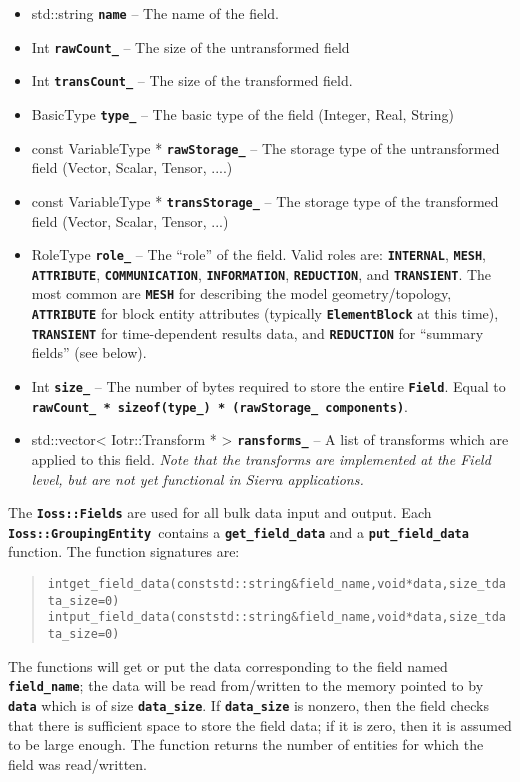 \documentclass[11pt,twoside]{article}
\newcommand{\code}[1]
   {\mbox{\bf\tt #1}\null}
\newenvironment{source}
{\small\begin{quote}\begin{alltt}}
{\end{alltt}\end{quote}\normalsize}
\begin{document}
\begin{itemize}
\item {
std::string \code{name} -- The name of the field.}
\item {
Int \code{rawCount\_} -- The size of the untransformed
field }
\item {
Int \code{transCount\_} -- The size of the transformed
field.}
\item {
BasicType \code{type\_} -- The basic type of the field
(Integer, Real, String)}
\item {
const VariableType * \code{rawStorage\_} -- The storage
type of the untransformed field (Vector, Scalar, Tensor, ....)}
\item {
const VariableType * \code{transStorage\_} -- The storage
type of the transformed field (Vector, Scalar, Tensor, ...)}
\item {
RoleType \code{role\_} -- The ``role'' of the field. Valid
roles are: \code{INTERNAL}, \code{MESH}, \code{ATTRIBUTE},
\code{COMMUNICATION}, \code{INFORMATION},
\code{REDUCTION}, and \code{TRANSIENT}. The most
common are \code{MESH} for describing the model
geometry/topology, \code{ATTRIBUTE} for block entity attributes
(typically \code{ElementBlock} at this time), \code{TRANSIENT} for time{}-dependent
results data, and \code{REDUCTION} for ``summary fields''
(see below).}
\item {
Int \code{size\_} -- The number of bytes required to store
the entire \code{Field}. Equal to \code{rawCount\_
* sizeof(type\_) * (rawStorage\_ components)}. }
\item {
std::vector{\textless} Iotr::Transform * {\textgreater} 
\code{ransforms\_} -- A list of transforms which are
applied to this field. \textit{Note that the transforms are implemented
at the Field level, but are not yet functional in Sierra
applications.}}
\end{itemize}
The \code{Ioss::Fields} are used for all bulk data input and
output. Each \code{Ioss::GroupingEntity }contains a
\code{get\_field\_data} and a
\code{put\_field\_data} function. The function signatures
are:
\begin{source}
int get\_field\_data(const std::string \&field\_name, void *data, size\_t data\_size=0)
int put\_field\_data(const std::string \&field\_name, void *data, size\_t data\_size=0)
\end{source}

The functions will get or put the data corresponding to the field
named \code{field\_name}; the data will be read from/written to the
memory pointed to by \code{data} which is of size \code{data\_size}.
If \code{data\_size} is nonzero, then the field checks that there is
sufficient space to store the field data; if it is zero, then it is
assumed to be large enough.  The function returns the number of
entities for which the field was read/written.
\end{document}
